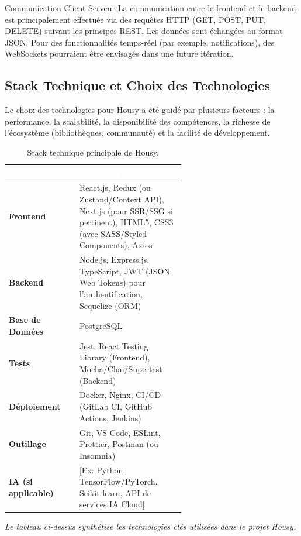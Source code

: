 \documentclass[11pt,a4paper]{report}
\begin{document}
\begin{infobox}{Communication Client-Serveur}
La communication entre le frontend et le backend est principalement effectuée via des requêtes HTTP (GET, POST, PUT, DELETE) suivant les principes REST. Les données sont échangées au format JSON. Pour des fonctionnalités temps-réel (par exemple, notifications), des WebSockets pourraient être envisagés dans une future itération.
\end{infobox}

\subsection{Stack Technique et Choix des Technologies}
\label{ssec:stack_technique}
Le choix des technologies pour Housy a été guidé par plusieurs facteurs : la performance, la scalabilité, la disponibilité des compétences, la richesse de l'écosystème (bibliothèques, communauté) et la facilité de développement.

\begin{table}[h!]
\centering
\caption{Stack technique principale de Housy.}
\label{tab:stack_technique}
\begin{tabular}{>{\bfseries}l p{0.6\linewidth}}
\toprule
\rowcolor{HousyBlue!80} %
\textcolor{white}{Composant} & \textcolor{white}{Technologies / Outils} \\
\midrule
Frontend & React.js, Redux (ou Zustand/Context API), Next.js (pour SSR/SSG si pertinent), HTML5, CSS3 (avec SASS/Styled Components), Axios \\
Backend & Node.js, Express.js, TypeScript, JWT (JSON Web Tokens) pour l'authentification, Sequelize (ORM) \\
Base de Données & PostgreSQL \\
Tests & Jest, React Testing Library (Frontend), Mocha/Chai/Supertest (Backend) \\
Déploiement & Docker, Nginx, CI/CD (GitLab CI, GitHub Actions, Jenkins) \\
Outillage & Git, VS Code, ESLint, Prettier, Postman (ou Insomnia) \\
IA (si applicable) & [Ex: Python, TensorFlow/PyTorch, Scikit-learn, API de services IA Cloud] \\
\bottomrule
\end{tabular}
\end{table}
\textit{Le tableau ci-dessus synthétise les technologies clés utilisées dans le projet Housy.}
\end{document}
